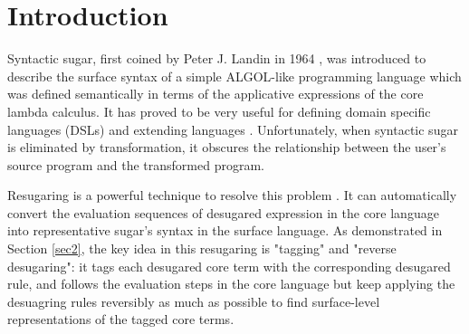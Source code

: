 \section{Introduction}








Syntactic sugar, first coined by Peter J. Landin in 1964 \cite{syntacticsugar}, was introduced to describe the surface syntax of a simple ALGOL-like programming language which was defined semantically in terms of the applicative expressions of the core lambda calculus. It has proved to be very useful for defining domain specific languages (DSLs) and extending languages \cite{FellFFKBMT18,CulpFFK19}.
Unfortunately, when syntactic sugar is eliminated by transformation, it obscures the relationship between the user’s source program and the transformed program.

%

Resugaring is a powerful technique to resolve this problem \cite{resugaring,hygienic}. It  can automatically convert the evaluation sequences of desugared expression in the core language into representative sugar's syntax in the surface language.
As demonstrated in Section \ref{sec2},
the key idea in this resugaring is "tagging" and "reverse desugaring": it tags each desugared core term with the corresponding desugared rule, and follows the evaluation steps in the core language but keep applying the desuagring rules reversibly as much as possible to find surface-level representations of the tagged core terms.

